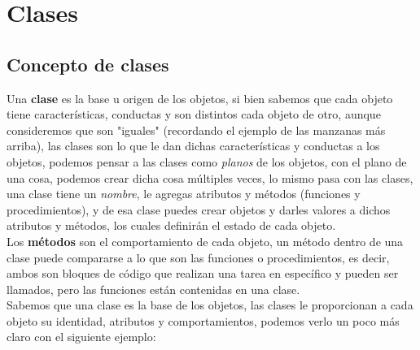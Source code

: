 \section{Clases}

\subsection{Concepto de clases}
Una \textbf{clase} es la base u origen de los objetos, si bien sabemos que cada objeto tiene características, conductas y son distintos cada objeto de otro, aunque consideremos que son "iguales" (recordando el ejemplo de las manzanas más arriba), las clases son lo que le dan dichas características y conductas a los objetos, podemos pensar a las clases como \textit{planos} de los objetos, con el plano de una cosa, podemos crear dicha cosa múltiples veces, lo mismo pasa con las clases, una clase tiene un \textit{nombre}, le agregas atributos y métodos (funciones y procedimientos), y de esa clase puedes crear objetos y darles valores a dichos atributos y métodos, los cuales definirán el estado de cada objeto.\\
Los \textbf{métodos} son el comportamiento de cada objeto, un método dentro de una clase puede compararse a lo que son las funciones o procedimientos, es decir, ambos son bloques de código que realizan una tarea en específico y pueden ser llamados, pero las funciones están contenidas en una clase.\\
Sabemos que una clase es la base de los objetos, las clases le proporcionan a cada objeto su identidad, atributos y comportamientos, podemos verlo un poco más claro con el siguiente ejemplo:

